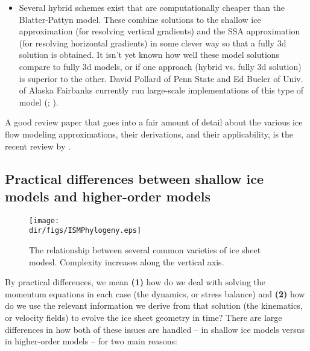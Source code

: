 \begin{itemize}
\item Several hybrid schemes exist that are computationally cheaper than the Blatter-Pattyn model. These combine solutions to the shallow ice approximation (for resolving vertical gradients) and the SSA approximation (for resolving horizontal gradients) in some clever way so that a fully 3d solution is obtained. It isn't yet known how well these model solutions compare to fully 3d models, or if one approach (hybrid vs. fully 3d solution) is superior to the other. David Pollard of Penn State and Ed Bueler of Univ. of Alaska Fairbanks currently run large-scale implementations of this type of model (\citet{Bueler:2009ee}; \citet{Pollard:2009ed}).
\end{itemize}

A good review paper that goes into a fair amount of detail about the various ice flow modeling approximations, their derivations, and their applicability, is the recent review by \citet{Schoof:2013is}.

\subsection{Practical differences between shallow ice models and higher-order models}

\begin{figure}
  \begin{center}
    \texttt{[image: \\dir/figs/ISMPhylogeny.eps]}
   \end{center}
  \caption{The relationship between several common varieties of ice sheet modesl. Complexity increases along the vertical axis.}
   \label{fig:phylogeny}
\end{figure} 

By practical differences, we mean \textbf{(1)} how do we deal with solving the momentum equations in each case (the dynamics, or stress balance) and \textbf{(2)} how do we use the relevant information we derive from that solution (the kinematics, or velocity fields) to evolve the ice sheet geometry in time? There are large differences in how both of these issues are handled -- in shallow ice models versus in higher-order models -- for two main reasons:

